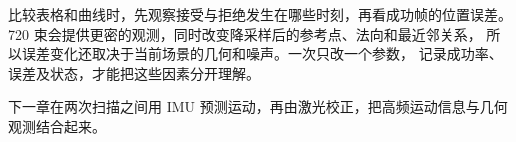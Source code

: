 比较表格和曲线时，先观察接受与拒绝发生在哪些时刻，再看成功帧的位置误差。
720 束会提供更密的观测，同时改变降采样后的参考点、法向和最近邻关系，
所以误差变化还取决于当前场景的几何和噪声。一次只改一个参数，
记录成功率、误差及状态，才能把这些因素分开理解。

下一章在两次扫描之间用 IMU 预测运动，再由激光校正，把高频运动信息与几何观测结合起来。
